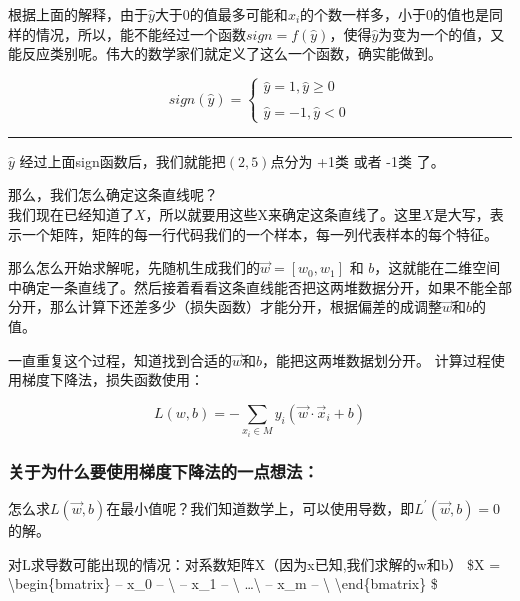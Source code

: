 \documentclass[11pt]{article}
\begin{document}
根据上面的解释，由于\(\hat y\)大于0的值最多可能和\(x_i\)的个数一样多，小于0的值也是同样的情况，所以，能不能经过一个函数\(sign = f(\hat y)\)，使得\(\hat y\)为变为一个的值，又能反应类别呢。伟大的数学家们就定义了这么一个函数，确实能做到。

\[
sign(\hat y) = 
\begin{cases}
\hat y = 1, \hat y \geq 0\\\\
\hat y = -1, \hat y < 0
\end{cases}
\]

\begin{center}\rule{0.5\linewidth}{\linethickness}\end{center}

\(\hat y\) 经过上面sign函数后，我们就能把\((2,5)\)点分为 +1类 或者 -1类
了。

    那么，我们怎么确定这条直线呢？\\
我们现在已经知道了\(X\)，所以就要用这些X来确定这条直线了。这里\(X\)是大写，表示一个矩阵，矩阵的每一行代码我们的一个样本，每一列代表样本的每个特征。

    那么怎么开始求解呢，先随机生成我们的\(\vec w=[w_0, w_1]\) 和
\(b\)，这就能在二维空间中确定一条直线了。然后接着看看这条直线能否把这两堆数据分开，如果不能全部分开，那么计算下还差多少（损失函数）才能分开，根据偏差的成调整\(\vec w\)和\(b\)的值。

一直重复这个过程，知道找到合适的\(\vec w\)和\(b\)，能把这两堆数据划分开。
计算过程使用梯度下降法，损失函数使用：

\[
L(w, b) = -\sum_{x_i \in M} y_i(\vec w \cdot \vec x_i + b)
\]

    \hypertarget{ux5173ux4e8eux4e3aux4ec0ux4e48ux8981ux4f7fux7528ux68afux5ea6ux4e0bux964dux6cd5ux7684ux4e00ux70b9ux60f3ux6cd5}{%
\subsubsection{关于为什么要使用梯度下降法的一点想法：}\label{ux5173ux4e8eux4e3aux4ec0ux4e48ux8981ux4f7fux7528ux68afux5ea6ux4e0bux964dux6cd5ux7684ux4e00ux70b9ux60f3ux6cd5}}

怎么求\(L(\vec w, b)\)在最小值呢？我们知道数学上，可以使用导数，即\(L^{'}(\vec w, b)=0\)的解。

对L求导数可能出现的情况：对系数矩阵X（因为x已知,我们求解的w和b） \$X =
\textbackslash{}begin\{bmatrix\} -- x\_0 -- \textbackslash{} -- x\_1 --
\textbackslash{} \ldots{}\textbackslash{} -- x\_m -- \textbackslash{}
\textbackslash{}end\{bmatrix\} \$
\end{document}
